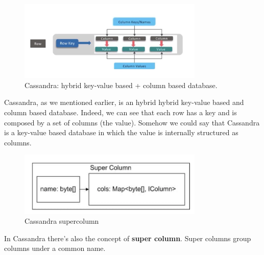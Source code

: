 \documentclass[10pt,a4paper]{article}
\begin{document}
\pagebreak
\begin{figure}[ht!]
 \hfill \includegraphics[width=250pt]{images/cassandra-data-model3.png}\hspace*{\fill}
  \caption{Cassandra: hybrid key-value based + column based database.}
\end{figure} 
Cassandra, as we mentioned earlier, is an hybrid hybrid key-value based and column based database. Indeed, we can see that each row has a key and is composed by a set of columns (the value). Somehow we could say that Cassandra is a key-value based database in which the value is internally structured as columns.

\begin{figure}[ht!]
 \hfill \includegraphics[width=250pt]{images/cassandra-supercolumn.png}\hspace*{\fill}
  \caption{Cassandra supercolumn}
\end{figure} 
In Cassandra there's also the concept of \textbf{super column}. Super columns group columns under a common name.
\end{document}
